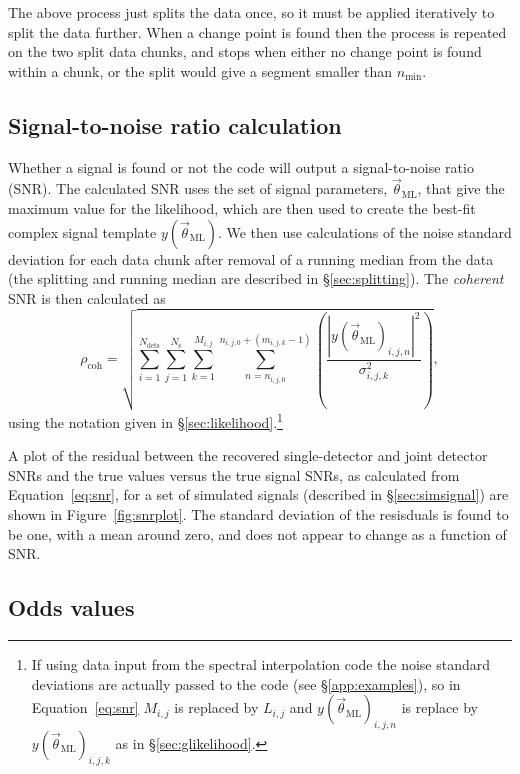 The above process just splits the data once, so it must be applied iteratively to split the data further. When a change point is
found then the process is repeated on the two split data chunks, and stops when either no change point is found within a chunk,
or the split would give a segment smaller than $n_{\text{min}}$.

\subsection{Signal-to-noise ratio calculation}\label{sec:snr}

Whether a signal is found or not the code will output a signal-to-noise ratio (SNR). The calculated SNR uses the set of signal
parameters, $\vec{\theta}_{\text{ML}}$, that give the maximum value for the likelihood, which are then used to create the best-fit
complex signal template $y(\vec{\theta}_{\text{ML}})$. We then use calculations of the
noise standard deviation for each data chunk after removal of a running median from the data (the splitting and running median are
described in \S\ref{sec:splitting}). The {\it coherent} SNR is then calculated as
\begin{equation}\label{eq:snr}
 \rho_{\text{coh}} = \sqrt{\sum_{i=1}^{N_{\text{dets}}} \sum_{j=1}^{N_{\text{s}}}
\sum_{k=1}^{M_{i,j}} \sum_{n=n_{i,j,0}}^{n_{i,j,0}+(m_{i,j,k}-1)}\left(\frac{|y(\vec{\theta}_{\text{ML}})_{i,j,n}|^2}{\sigma_{i,j,k}^2}\right)},
\end{equation}
using the notation given in \S\ref{sec:likelihood}.\footnote{If using data input from the spectral interpolation code \citep{2017CQGra..34a5010D}
the noise standard deviations are actually passed to the code (see \S\ref{app:examples}), so in Equation~\ref{eq:snr} $M_{i,j}$ is replaced
by $L_{i,j}$ and $y(\vec{\theta}_{\text{ML}})_{i,j,n}$ is replace by $y(\vec{\theta}_{\text{ML}})_{i,j,k}$ as in \S\ref{sec:glikelihood}.}

A plot of the residual between the recovered single-detector and joint detector SNRs and the true values versus the true signal SNRs,
as calculated from Equation~\ref{eq:snr}, for a set of simulated signals (described in \S\ref{sec:simsignal}) are shown in Figure~\ref{fig:snrplot}.
The standard deviation of the resisduals is found to be one, with a mean around zero, and does not appear to change as a function of SNR.

\subsection{Odds values}\label{sec:odds}

